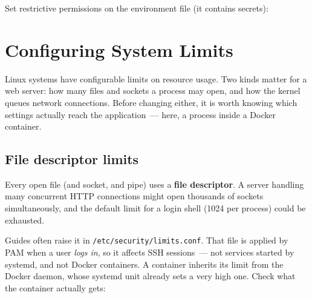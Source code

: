 \noindent{}Set restrictive permissions on the environment file (it contains secrets):

\begin{codebox}[short]

\begin{Shaded}
\begin{Highlighting}[]
\end{Highlighting}
\end{Shaded}

\end{codebox}

\setcounter{section}{8}
\section{Configuring System Limits}\label{21-system-setup:219-configuring-system-limits}

Linux systems have configurable limits on resource usage. Two kinds matter for a web server: how many files and sockets a process may open, and how the kernel queues network connections. Before changing either, it is worth knowing which settings actually reach the application~--- here, a process inside a Docker container.

\subsection*{File descriptor limits}\label{21-system-setup:file-descriptor-limits}

Every open file (and socket, and pipe) uses a \textbf{file descriptor}. A server handling many concurrent HTTP connections might open thousands of sockets simultaneously, and the default limit for a login shell (1024 per process) could be exhausted.

Guides often raise it in \texttt{/}\allowbreak{}\texttt{etc/}\allowbreak{}\texttt{security/}\allowbreak{}\texttt{limits.}\allowbreak{}\texttt{conf}. That file is applied by PAM when a user \emph{logs in}, so it affects SSH sessions~--- not services started by systemd, and not Docker containers. A container inherits its limit from the Docker daemon, whose systemd unit already sets a very high one. Check what the container actually gets:

